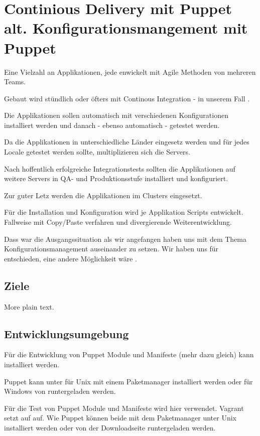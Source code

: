 \documentclass{article}
\begin{document}
\section{Continious Delivery mit Puppet alt. Konfigurationsmangement mit Puppet}

Eine Vielzahl an Applikationen, jede enwickelt mit Agile Methoden von mehreren Teams.

Gebaut wird stündlich oder öfters mit Continous Integration - in unserem Fall \cite{jenkins}.

Die Applikationen sollen automatisch mit verschiedenen Konfigurationen installiert werden und danach - ebenso automatisch - getestet werden.

Da die Applikationen in unterschiedliche Länder eingesetz werden und für jedes
Locale getestet werden sollte, multiplizieren sich die Servers.

Nach hoffentlich erfolgreiche Integrationstests sollten die Applikationen auf
weitere Servers in QA- und Produktionsstufe installiert und konfiguriert.

Zur guter Letz werden die Applikationen im Clusters eingesetzt.

Für die Installation und Konfiguration wird je Applikation Scripts entwickelt. Fallweise mit Copy/Paste verfahren und divergierende Weiterentwicklung.

Dass war die Ausgangssituation als wir angefangen haben uns mit dem Thema Konfigurationsmanagement auseinander zu setzen. Wir haben uns für 
\cite{puppet} entschieden, eine andere Möglichkeit wäre \cite{chef}.

\subsection{Ziele}

More plain text.

\subsection{Entwicklungsumgebung}

Für die Entwicklung von Puppet Module und Manifeste (mehr dazu gleich) kann \cite{geppeto} installiert werden.

Puppet kann unter für Unix mit einem Paketmanager installiert werden oder für Windows von \cite{puppetlabs} runtergeladen werden.

Für die Test von Puppet Module und Manifeste wird hier \cite{vagrant} verwendet. Vagrant setzt auf \cite{openbox} auf. 
Wie Puppet können beide mit dem Paketmanager unter Unix installiert werden oder von der Downloadseite runtergeladen werden.
\end{document}
